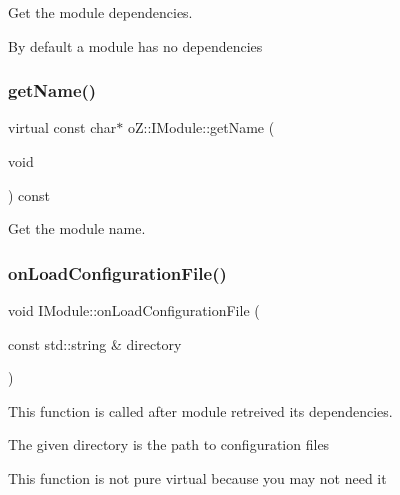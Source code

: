 Get the module dependencies. 

By default a module has no dependencies \mbox{\label{classo_z_1_1_i_module_af41d45158fd28e1bd86a34e25f5282d6}} 
\subsubsection{\texorpdfstring{getName()}{getName()}}
{\footnotesize\ttfamily virtual const char$\ast$ o\+Z\+::\+I\+Module\+::get\+Name (\begin{DoxyParamCaption}\item[{void}]{ }\end{DoxyParamCaption}) const\hspace{0.3cm}{\ttfamily [pure virtual]}}



Get the module name. 

\mbox{\label{classo_z_1_1_i_module_a61a2cc76594401ed2f50931a6a6b76f3}} 
\subsubsection{\texorpdfstring{onLoadConfigurationFile()}{onLoadConfigurationFile()}}
{\footnotesize\ttfamily void I\+Module\+::on\+Load\+Configuration\+File (\begin{DoxyParamCaption}\item[{const std\+::string \&}]{directory }\end{DoxyParamCaption})\hspace{0.3cm}{\ttfamily [virtual]}}



This function is called after module retreived its dependencies. 

The given directory is the path to configuration files

This function is not pure virtual because you may not need it \mbox{\label{classo_z_1_1_i_module_a3dc905faa6df5e22eecc6ffbc923fd95}} 

